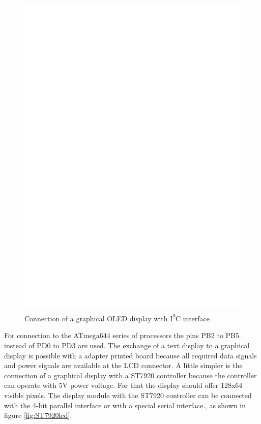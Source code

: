 \begin{figure}[H]
\centering
\includegraphics[width=14cm]{../FIG/SSD1306_I2C.eps}
\caption{Connection of a graphical OLED display with I\textsuperscript{2}C interface}
\label{fig:ssd1306i2c}
\end{figure}

For connection to the ATmega644 series of processors the pins PB2 to PB5 instead of PD0 to PD3 are used.
The exchange of a text display to a graphical display is possible with a adapter printed board because
all required data signals and power signals are available at the LCD connector.
A little simpler is the connection of a graphical display with a ST7920 controller because
the controller can operate with 5V power voltage.
For that the display should offer 128x64 visible pixels.
The display module with the ST7920 controller can be connected with the 4-bit parallel interface or with a
special serial interface., as shown in figure \ref{fig:ST7920lcd}.
 
